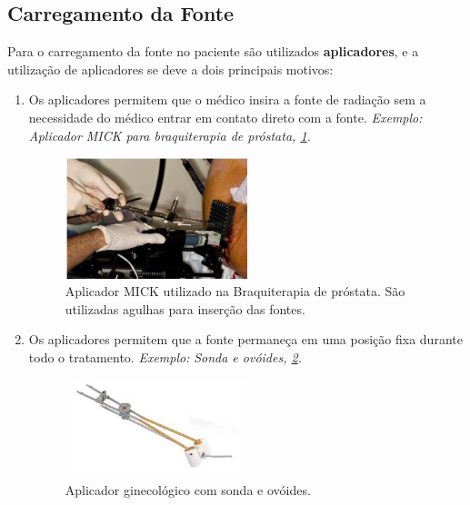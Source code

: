 \documentclass[11pt,a4paper]{article}
\begin{document}
		\subsection{Carregamento da Fonte}

			Para o carregamento da fonte no paciente são utilizados \textbf{aplicadores}, e a utilização de aplicadores se deve a dois principais motivos:

			\begin{enumerate}
				\item Os aplicadores permitem que o médico insira a fonte de radiação sem a necessidade do médico entrar em contato direto com a fonte. \textit{\textcolor{CarnationPink}{Exemplo:}} \textit{Aplicador MICK para braquiterapia de próstata,  \ref{img:aplicadorMick}.}

				\begin{figure}[h]
					\centering
					\includegraphics[width=0.5\textwidth]{Imagens/aplicadorMick.JPG}
					\caption{Aplicador MICK utilizado na Braquiterapia de próstata. São utilizadas agulhas para inserção das fontes.}
					\label{img:aplicadorMick}
				\end{figure}

				\item Os aplicadores permitem que a fonte permaneça em uma posição fixa durante todo o tratamento. \textit{\textcolor{CarnationPink}{Exemplo:}} \textit{Sonda e ovóides,    \ref{img:aplicadorSondaEOvoides}.}
				
				\begin{figure}[h]
					\centering
					\includegraphics[width=0.5\textwidth]{Imagens/aplicadorSondaEOvoides.jpg}
					\caption{Aplicador ginecológico com sonda e ovóides.}
					\label{img:aplicadorSondaEOvoides}
				\end{figure}
			\end{enumerate}
\end{document}
